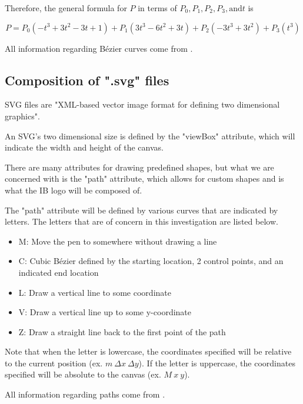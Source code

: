 \documentclass[letterpaper, 12pt]{article}
\begin{document}
Therefore, the general formula for \(P\) in terms of
\(P_0, P_1, P_2, P_3, \text{and} t\) is

\begin{equation} \label{eq:pFormula}
    P = P_0(-t^3+3t^2-3t+1) + P_1(3t^3-6t^2+3t) + P_2(-3t^3+3t^2) + P_3(t^3)
\end{equation}

All information regarding Bézier curves come from \cite{holmerBeautyBezierCurves2021}.

\subsection{Composition of ".svg" files}

SVG files are "XML-based vector image format for defining two dimensional
graphics"\cite{SVG2023}.

An SVG's two dimensional size is defined by the "viewBox" attribute,
which will indicate the width and height of the canvas.

There are many attributes for drawing predefined shapes, but what
we are concerned with is the "path" attribute, which allows for custom
shapes and is what the IB logo will be composed of.

The "path" attribute will be defined by various curves that are indicated
by letters. The letters that are of concern in this investigation are
listed below.
\begin{itemize}
    \item M: Move the pen to somewhere without drawing a line
    \item C: Cubic Bézier defined by the starting location, 2 control points, and an indicated end location
    \item L: Draw a vertical line to some coordinate
    \item V: Draw a vertical line up to some y-coordinate
    \item Z: Draw a straight line back to the first point of the path
\end{itemize}

Note that when the letter is lowercase, the coordinates specified will
be relative to the current position (ex. \(m~\Delta x~\Delta y\)). If the letter is uppercase, the
coordinates specified will be absolute to the canvas (ex. \(M~x~y\)).

All information regarding paths come from \cite{mozilladevelopernetworkPathsSVGScalable2023}.
\end{document}
